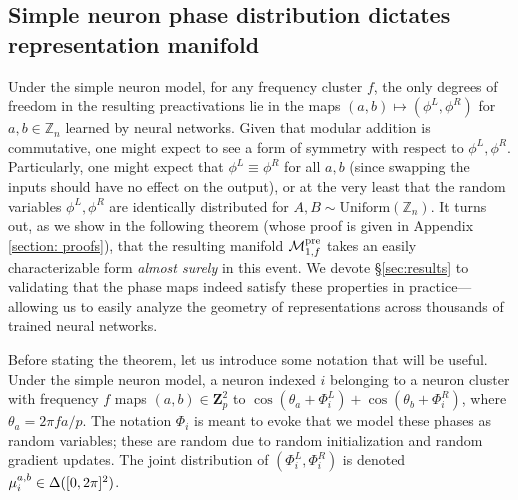 \documentclass{article} %
\theoremstyle{plain}
\theoremstyle{definition}
\newtheorem{empirical fact}[theorem]{Empirical Fact}
\begin{document}
\subsection{Simple neuron phase distribution dictates representation manifold}\label{subsect:theorems}
Under the simple neuron model, for any frequency cluster $f$, the only degrees of freedom in the resulting preactivations lie in the maps $(a, b)\mapsto(\phi^L, \phi^R)$ for $a,b\in\mathbb{Z}_n$ learned by neural networks.
Given that modular addition is commutative, one might expect to see a form of symmetry with respect to $\phi^L, \phi^R$.
Particularly, one might expect that $\phi^L\equiv\phi^R$ for all $a, b$ (since swapping the inputs should have no effect on the output), or at the very least that the random variables $\phi^L, \phi^R$ are identically distributed for $A, B\sim\mathrm{Uniform}(\mathbb{Z}_n)$.
It turns out, as we show in the following theorem (whose proof is given in Appendix \ref{section: proofs}), that the resulting manifold $\mathcal{M}^{\rm pre}_{1, f}$ takes an easily characterizable form \textit{almost surely} in this event.
We devote \S\ref{sec:results} to validating that the phase maps indeed satisfy these properties in practice---allowing us to easily analyze the geometry of representations across thousands of trained neural networks.

Before stating the theorem, let us introduce some notation that will be useful.
Under the simple neuron model, a neuron indexed $i$ belonging to a neuron cluster with frequency $f$ maps $(a, b)\in\mathbf{Z}_p^2$ to $\cos(\theta_a + \Phi_i^{L}) + \cos(\theta_b + \Phi_i^{R})$, where $\theta_a = 2\pi fa/p$.
The notation $\Phi_i$ is meant to evoke that we model these phases as random variables; these are random due to random initialization and random gradient updates.
The joint distribution of $(\Phi_i^{L}, \Phi_i^{R})$ is denoted $\mu_{i}^{a, b}\in\Delta([0,2\pi]^2)$.
\end{document}
